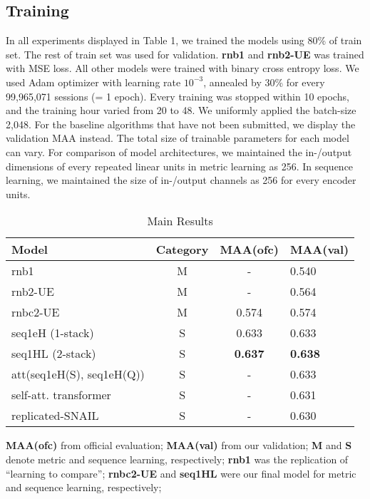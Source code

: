 \subsection{Training}
In all experiments displayed in Table 1, we trained the models using $80$\% of train set. The rest of train set was used for  validation. \textbf{rnb1} and \textbf{rnb2-UE} was trained with MSE loss. All other models were trained with binary cross entropy loss.  We used Adam\cite{kingma2014adam} optimizer with learning rate $10^{-3}$, annealed by 30\% for every 99,965,071 sessions (= 1 epoch). Every training was stopped within 10 epochs, and the training hour varied from 20 to 48. We uniformly applied the batch-size 2,048. For the baseline algorithms that have not been submitted, we display the validation MAA instead. The total size of  trainable parameters for each model can vary. For comparison of model architectures, we maintained the in-/output dimensions of every repeated linear units in metric learning as 256. In sequence learning, we maintained the size of in-/output channels as 256 for every encoder units.
\begin{table}
\small
\begin{threeparttable}
  \caption{Main Results}
  \label{mainresult}
  \begin{tabular}{lccl}
    \toprule
    Model & Category & MAA(ofc) & MAA(val)\\
    \midrule
    rnb1  & M & - & 0.540\\
    rnb2-UE  & M & - & 0.564\\
    rnbc2-UE & M &0.574 & 0.574\\
    \midrule
    seq1eH (1-stack) & S &0.633 & 0.633\\
    seq1HL (2-stack)& S & \textbf{0.637} & \textbf{0.638}\\
    att(seq1eH(S), seq1eH(Q))& S & -  & 0.633\\
    self-att. transformer & S & -  & 0.631\\
    replicated-SNAIL & S & - &0.630\\
  \bottomrule
\end{tabular}
    \begin{tablenotes}
      \footnotesize
      \item \textbf{MAA(ofc)} from official evaluation; \textbf{MAA(val)} from our validation; \textbf{M} and \textbf{S} denote metric and sequence learning, respectively; \textbf{rnb1} was the replication of ``learning to compare''\cite{sung2018learning}; \textbf{rnbc2-UE} and \textbf{seq1HL} were our final model for metric and sequence learning, respectively; 
      
\end{tablenotes}
\end{threeparttable}
\end{table}
